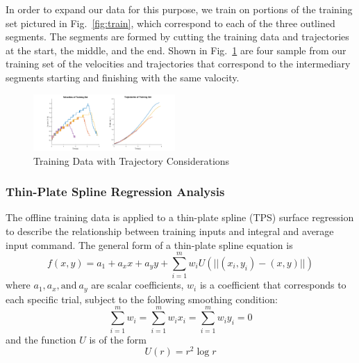 \documentclass[letterpaper, 10 pt, conference]{ieeeconf}  %
\newcommand\NB[1]{$\spadesuit$\footnote{NB: #1}}
\begin{document}
In order to expand our data for this purpose, we train on portions of the training set pictured in Fig.~\ref{fig:train}, which correspond to each of the three outlined segments. The segments are formed by cutting the training data and trajectories at the start, the middle, and the end. Shown in Fig.~\ref{fig:trainelab} are four sample from our training set of the velocities and trajectories that correspond to the intermediary segments starting and finishing with the same valocity. %
\begin{figure}[h]
	\includegraphics[width=0.48\textwidth]{images/inttrain.png}
	\caption{Training Data with Trajectory Considerations}
	\label{fig:trainelab}
\end{figure}


\subsubsection{Thin-Plate Spline Regression Analysis}

The offline training data is applied to a thin-plate spline (TPS) surface regression to describe the relationship between training inputs and integral and average input command. The general form of a thin-plate spline equation is 
\begin{equation}
    f(x,y) = a_1 + a_xx + a_yy + \sum_{i=1}^mw_iU(||(x_i,y_i)-(x,y)||)
\end{equation}
where $a_1,a_x,\text{and}~a_y$ are scalar coefficients, $w_i$ is a coefficient that corresponds to each specific trial, subject to the following smoothing condition: \begin{equation}
\sum_{i=1}^mw_i=\sum_{i=1}^mw_ix_i=\sum_{i=1}^mw_iy_i=0
\end{equation}
and the function $U$ is of the form
\begin{equation}
  U(r) = r^2\log{r} 
\end{equation}
\end{document}
